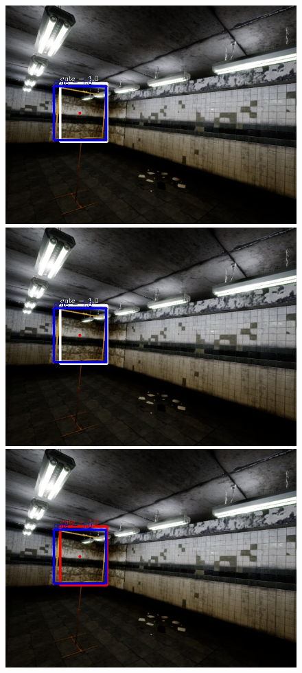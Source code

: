 \documentclass{article}
\begin{document}
\begin{figure}[htbp]
	\centering
	\begin{minipage}{0.3\linewidth}
		\includegraphics[width=\linewidth]{0000-04.jpg}
	\end{minipage}
	\hfill
	\begin{minipage}{0.3\linewidth}
		\includegraphics[width=\linewidth]{0000-06.jpg}
	\end{minipage}
	\hfill
	\begin{minipage}{0.3\linewidth}
		\includegraphics[width=\linewidth]{0000-08.jpg}

\end{minipage}
\end{figure}
\end{document}
